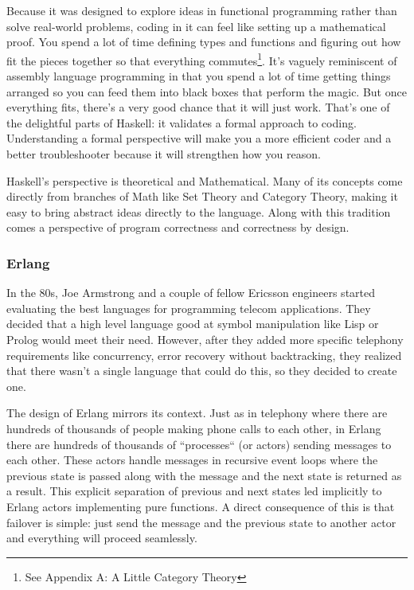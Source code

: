 Because it was designed to explore ideas in functional programming rather than
solve real-world problems, coding in it can feel like setting up a mathematical
proof. You spend a lot of time defining types and functions and figuring out
how fit the pieces together so that everything commutes\footnote{See Appendix
A: A Little Category Theory}. It's vaguely reminiscent of assembly language
programming in that you spend a lot of time getting things arranged so you can
feed them into black boxes that perform the magic. But once everything fits,
there's a very good chance that it will just work. That's one of the delightful
parts of Haskell: it validates a formal approach to coding. Understanding a
formal perspective will make you a more efficient coder and a better
troubleshooter because it will strengthen how you reason.

Haskell's perspective is theoretical and Mathematical. Many of its concepts
come directly from branches of Math like Set Theory and Category Theory, making
it easy to bring abstract ideas directly to the language. Along with this
tradition comes a perspective of program correctness and correctness by
design.


\subsubsection{Erlang}

In the 80s, Joe Armstrong and a couple of fellow Ericsson engineers started
evaluating the best languages for programming telecom applications. They
decided that a high level language good at symbol manipulation like Lisp or
Prolog would meet their need. However, after they added more specific
telephony requirements like concurrency, error recovery without backtracking,
they realized that there wasn't a single language that could do this, so they
decided to create one.

The design of Erlang mirrors its context. Just as in telephony where there are
hundreds of thousands of people making phone calls to each other, in Erlang
there are hundreds of thousands of ``processes`` (or actors) sending messages
to each other. These actors handle messages in recursive event loops where the
previous state is passed along with the message and the next state is returned
as a result. This explicit separation of previous and next states led
implicitly to Erlang actors implementing pure functions. A direct consequence
of this is that failover is simple: just send the message and the previous
state to another actor and everything will proceed seamlessly.

